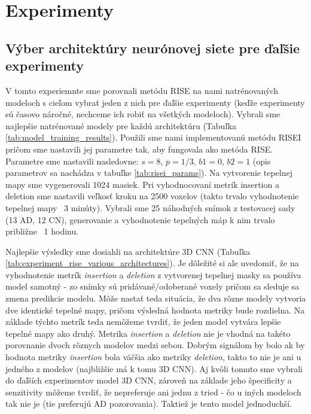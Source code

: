 \section{Experimenty}

\subsection{Výber architektúry neurónovej siete pre ďaľšie experimenty \label{sec:experiment_rise_various_architectures}}

V tomto experiemnte sme porovnali metódu RISE na nami natrénovaných modeloch s cieľom vybrať jeden z nich pre ďaľšie experimenty (keďže experimenty sú časovo náročné, nechceme ich robiť na všetkých modeloch). Vybrali sme najlepšie natrénované modely pre každú architektúru (Tabuľka \ref{tab:model_training_results}). Použili sme nami implementovanú metódu RISEI pričom sme nastavili jej parametre tak, aby fungovala ako metóda RISE.
Parametre sme nastavili nasledovne: $s = 8$, $p = 1/3$, $b1 = 0$, $b2 = 1$ (opis parametrov sa nachádza v tabuľke \ref{tab:risei_params}). Na vytvorenie tepelnej mapy sme vygenerovali 1024 masiek. Pri vyhodnocovaní metrík insertion a deletion sme nastavili veľkosť kroku na 2500 voxelov (takto trvalo vyhodnotenie tepelnej mapy ~3 minúty). Vybrali sme 25 náhodných snímok z testovacej sady (13 AD, 12 CN), generovanie a vyhodnotenie tepelných máp k nim trvalo približne ~1 hodinu. 

Najlepšie výsledky sme dosiahli na architektúre 3D CNN (Tabuľka \ref{tab:experiment_rise_various_architectures}). Je dôležité si ale uvedomiť, že na vyhodnotenie metrík \textit{insertion} a \textit{deletion} z vytvorenej tepelnej masky sa používa model samotný - zo snímky sú pridávané/odoberané voxely pričom sa sleduje sa zmena predikcie modelu. Môže nastať teda situácia, že dva rôzne modely vytvoria dve identické tepelné mapy, pričom výsledná hodnota metriky bude rozdielna. Na základe týchto metrík teda nemôžeme tvrdiť, že jeden model vytvára lepšie tepelné mapy ako druhý. Metrika \textit{insertion} a \textit{deletion} nie je vhodná na takéto porovnanie dvoch rôznych modelov medzi sebou.
Dobrým signálom by bolo ak by hodnota metriky \textit{insertion} bola väčšia ako metriky \textit{deletion}, takto to nie je ani u jedného z modelov (najbližšie má k tomu 3D CNN). Aj kvôli tomuto sme vybrali do ďaľších experimentov model 3D CNN, zároveň na základe jeho špecificity a senzitivity môžeme tvrdiť, že nepreferuje ani jednu z tried - čo u iných modeloch tak nie je (tie preferujú AD pozorovania). Taktiež je tento model jednoduchší.


